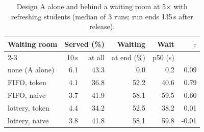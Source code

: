 \begin{table}[t]
\caption{Design A alone and behind a waiting room at 5$\times$ with refreshing students (median of 3 runs; run ends 135\,s after release).}
\label{tab:wr}
\centering
\footnotesize
\setlength{\tabcolsep}{2.5pt}
\begin{tabular}{@{}lrrrrr@{}}
\toprule
Waiting room & \multicolumn{2}{c}{Served (\%)} & Waiting & Wait & $\tau$ \\
\cmidrule(lr){2-3}
 & 10\,s & at all & at end (\%) & p50 (s) & \\
\midrule
none (A alone) & 6.1 & 43.3 & 0.0 & 0.2 & 0.09 \\
FIFO, token & 4.1 & 36.8 & 52.2 & 40.6 & 0.79 \\
FIFO, naive & 3.7 & 41.9 & 58.1 & 59.5 & 0.60 \\
lottery, token & 4.4 & 34.2 & 52.5 & 38.2 & 0.01 \\
lottery, naive & 3.8 & 41.8 & 58.1 & 59.8 & -0.01 \\
\bottomrule
\end{tabular}
\end{table}
